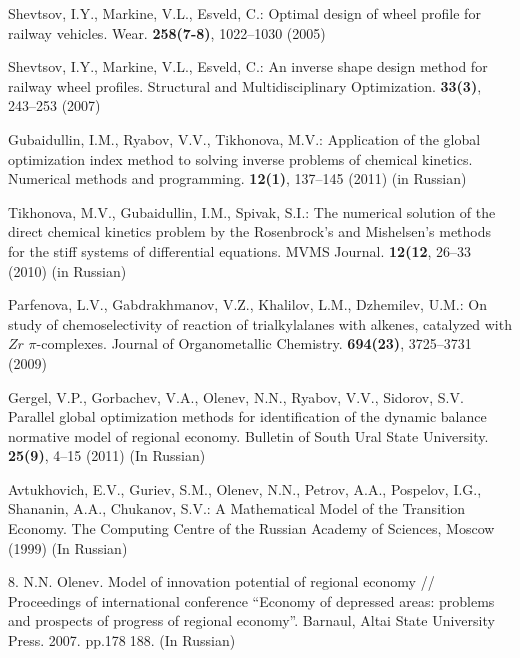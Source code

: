 \begin{thebibliography}{99.}

Shevtsov, I.Y., Markine, V.L., Esveld, C.: Optimal design of wheel profile for railway vehicles. Wear. \textbf{258(7-8)}, 1022--1030 (2005)

Shevtsov, I.Y., Markine, V.L., Esveld, C.: An inverse shape design method for railway wheel profiles. Structural and Multidisciplinary Optimization. \textbf{33(3)}, 243--253 (2007)

Gubaidullin, I.M., Ryabov, V.V., Tikhonova, M.V.: Application of the global optimization index method to solving inverse problems of chemical kinetics. Numerical methods and programming. \textbf{12(1)}, 137--145 (2011) (in Russian)

Tikhonova, M.V., Gubaidullin, I.M., Spivak, S.I.: The numerical solution of the direct chemical kinetics problem by the Rosenbrock's and Mishelsen's methods for the stiff systems of differential equations. MVMS Journal. \textbf{12(12}, 26--33 (2010) (in Russian)

Parfenova, L.V., Gabdrakhmanov, V.Z., Khalilov, L.M., Dzhemilev, U.M.: On study of chemoselectivity of reaction of trialkylalanes with alkenes, catalyzed with $Zr$ $\pi$-complexes. Journal of Organometallic Chemistry. \textbf{694(23)}, 3725--3731 (2009)

Gergel, V.P., Gorbachev, V.A., Olenev, N.N., Ryabov, V.V., Sidorov, S.V. Parallel global optimization methods for identification of the dynamic balance normative model of regional economy. Bulletin of South Ural State University. \textbf{25(9)}, 4--15 (2011) (In Russian)

Avtukhovich, E.V., Guriev, S.M., Olenev, N.N., Petrov, A.A., Pospelov, I.G., Shananin, A.A., Chukanov, S.V.: A Mathematical Model of the Transition Economy. The Computing Centre of the Russian Academy of Sciences, Moscow (1999) (In Russian)

8. N.N. Olenev. Model of innovation potential of regional economy // Proceedings of international conference “Economy of depressed areas: problems and prospects of progress of regional economy”. Barnaul, Altai State University Press. 2007. pp.178188. (In Russian)




\end{thebibliography}

%
